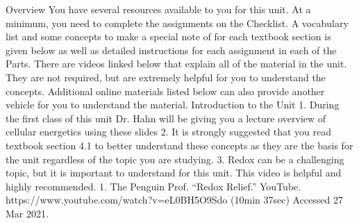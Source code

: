 ﻿Overview
You have several resources available to you for this unit. At a minimum, you need to complete the assignments on the Checklist. 
A vocabulary list and some concepts to make a special note of for each textbook section is given below as well as detailed instructions for each assignment in each of the Parts.
There are videos linked below that explain all of the material in the unit. They are not required, but are extremely helpful for you to understand the concepts. Additional online materials listed below can also provide another vehicle for you to understand the material.
Introduction to the Unit
1. During the first class of this unit Dr. Hahn will be giving you a lecture overview of cellular energetics using these slides
2. It is strongly suggested that you read textbook section 4.1 to better understand these concepts as they are the basis for the unit regardless of the topic you are studying.
3. Redox can be a challenging topic, but it is important to understand for this unit. This video is helpful and highly recommended.
   1. The Penguin Prof. “Redox Relief.” YouTube. https://www.youtube.com/watch?v=eL0BH5O9Sdo (10min 37sec) Accessed 27 Mar 2021.


